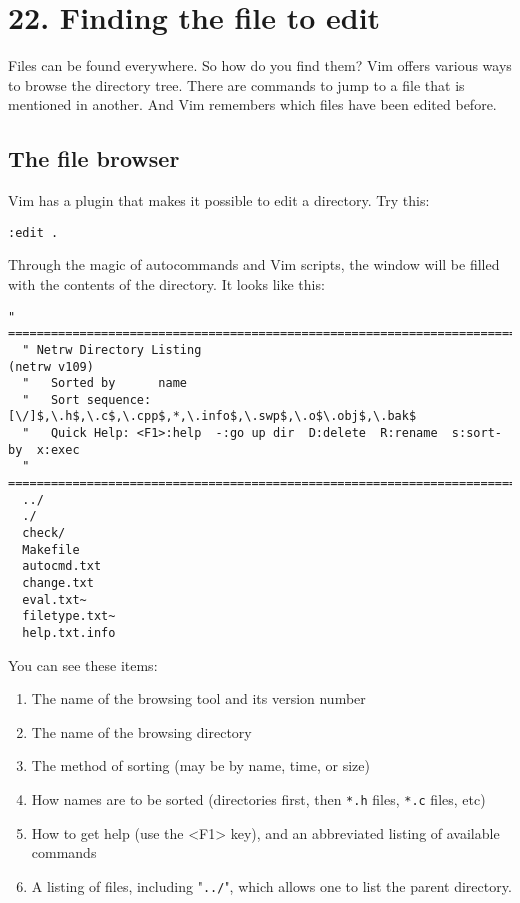 \section{22. Finding the file to edit}
Files can be found everywhere.  So how do you find them?  Vim offers various
ways to browse the directory tree.  There are commands to jump to a file that
is mentioned in another.  And Vim remembers which files have been edited
before.
\subsection{The file browser}

Vim has a plugin that makes it possible to edit a directory.  Try this:

\begin{Verbatim}[samepage=true]
 :edit .
\end{Verbatim}

Through the magic of autocommands and Vim scripts, the window will be filled with the contents of the directory.
It looks like this:

\begin{Verbatim}[samepage=true]
  " ============================================================================ 
  " Netrw Directory Listing                                        (netrw v109) 
  "   Sorted by      name 
  "   Sort sequence: [\/]$,\.h$,\.c$,\.cpp$,*,\.info$,\.swp$,\.o$\.obj$,\.bak$ 
  "   Quick Help: <F1>:help  -:go up dir  D:delete  R:rename  s:sort-by  x:exec 
  " ============================================================================ 
  ../ 
  ./ 
  check/ 
  Makefile 
  autocmd.txt 
  change.txt 
  eval.txt~ 
  filetype.txt~ 
  help.txt.info 
\end{Verbatim}

You can see these items:

\begin{enumerate}
\item The name of the browsing tool and its version number
\item The name of the browsing directory
\item The method of sorting (may be by name, time, or size)
\item How names are to be sorted (directories first, then \texttt{*.h} files, \texttt{*.c} files, etc)
\item How to get help (use the <F1> key), and an abbreviated listing of available commands
\item A listing of files, including "\texttt{../}", which allows one to list the parent directory.
\end{enumerate}


